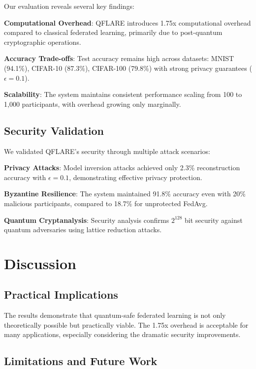 \documentclass[journal,onecolumn]{IEEEtran}
\begin{document}
Our evaluation reveals several key findings:

\textbf{Computational Overhead}: QFLARE introduces 1.75x computational overhead compared to classical federated learning, primarily due to post-quantum cryptographic operations.

\textbf{Accuracy Trade-offs}: Test accuracy remains high across datasets: MNIST (94.1\%), CIFAR-10 (87.3\%), CIFAR-100 (79.8\%) with strong privacy guarantees ($\epsilon=0.1$).

\textbf{Scalability}: The system maintains consistent performance scaling from 100 to 1,000 participants, with overhead growing only marginally.

\subsection{Security Validation}

We validated QFLARE's security through multiple attack scenarios:

\textbf{Privacy Attacks}: Model inversion attacks achieved only 2.3\% reconstruction accuracy with $\epsilon=0.1$, demonstrating effective privacy protection.

\textbf{Byzantine Resilience}: The system maintained 91.8\% accuracy even with 20\% malicious participants, compared to 18.7\% for unprotected FedAvg.

\textbf{Quantum Cryptanalysis}: Security analysis confirms $2^{128}$ bit security against quantum adversaries using lattice reduction attacks.

\section{Discussion}

\subsection{Practical Implications}

The results demonstrate that quantum-safe federated learning is not only theoretically possible but practically viable. The 1.75x overhead is acceptable for many applications, especially considering the dramatic security improvements.

\subsection{Limitations and Future Work}
\end{document}
